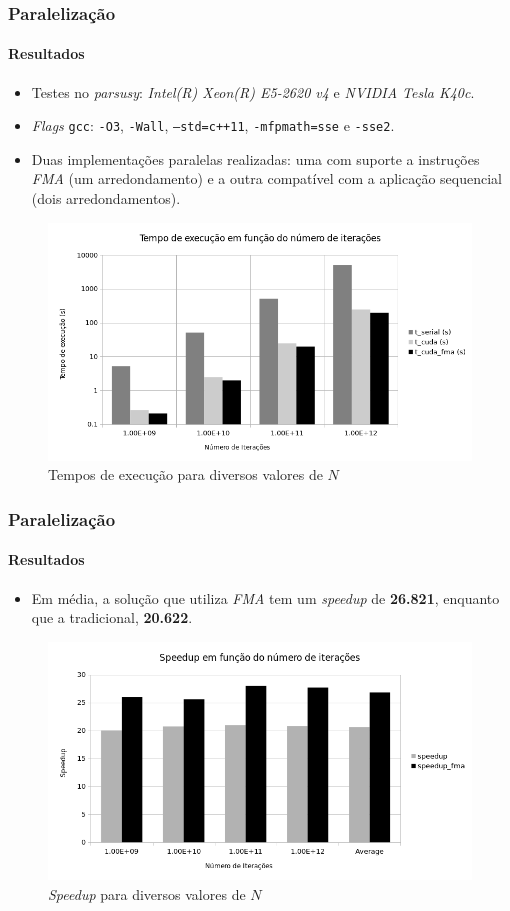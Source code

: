 \documentclass[10pt]{beamer}
\begin{document}
\begin{frame}
\frametitle{Paralelização}
\framesubtitle{Resultados}

\begin{itemize}
  \item Testes no \textit{parsusy}: \textit{Intel(R) Xeon(R) E5-2620 v4} e
  \textit{NVIDIA Tesla K40c}.
  \item \textit{Flags} \texttt{gcc}: \texttt{-O3}, \texttt{-Wall},
  \texttt{--std=c++11}, \texttt{-mfpmath=sse} e \texttt{-sse2}.
  \item Duas implementações paralelas realizadas: uma com suporte a instruções
  \textit{FMA} (um arredondamento) e a outra compatível com a aplicação
  sequencial (dois arredondamentos).
\end{itemize}

\begin{figure}
  \centering
  \includegraphics[width=0.55\linewidth]{img/time}
  \caption{Tempos de execução para diversos valores de \(N\)}
  \label{fig:time}
\end{figure}

\end{frame}

\begin{frame}
\frametitle{Paralelização}
\framesubtitle{Resultados}


\begin{itemize}
  \item Em média, a solução que utiliza \textit{FMA} tem um
\textit{speedup} de \textbf{26.821}, enquanto que a tradicional,
\textbf{20.622}.
\end{itemize}


\begin{figure}
  \centering
  \includegraphics[width=0.70\linewidth]{img/speedup}
  \caption{\textit{Speedup} para diversos valores de \(N\)}
  \label{fig:speedup}
\end{figure}

\end{frame}
\end{document}
